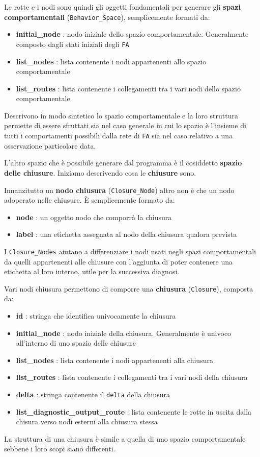 Le rotte e i nodi sono quindi gli oggetti fondamentali per generare gli \textbf{spazi comportamentali} (\texttt{Behavior\_Space}), semplicemente formati da:
\begin{itemize}
    \item \textbf{initial\_node} : nodo iniziale dello spazio comportamentale. Generalmente composto dagli stati iniziali degli \texttt{FA} 
    \item \textbf{list\_nodes} : lista contenente i nodi appartenenti allo spazio comportamentale
    \item \textbf{list\_routes} : lista contenente i collegamenti tra i vari nodi dello spazio comportamentale
\end{itemize}

Descrivono in modo sintetico lo spazio comportamentale e la loro struttura permette di essere sfruttati sia nel caso generale in cui lo spazio è l'insieme di tutti i comportamenti possibili dalla rete di \texttt{FA} sia nel caso relativo a una osservazione particolare data.

L'altro spazio che è possibile generare dal programma è il cosiddetto \textbf{spazio delle chiusure}. Iniziamo descrivendo cosa le \textbf{chiusure} sono.

Innanzitutto un \textbf{nodo chiusura} (\texttt{Closure\_Node}) altro non è che un nodo adoperato nelle chiusure. È semplicemente formato da:
\begin{itemize}
    \item \textbf{node} : un oggetto nodo che comporrà la chiusura
    \item \textbf{label} : una etichetta assegnata al nodo della chiusura qualora prevista
\end{itemize}
I \texttt{Closure\_Nodes} aiutano a differenziare i nodi usati negli spazi comportamentali da quelli appartenenti alle chiusure con l'aggiunta di poter contenere una etichetta al loro interno, utile per la successiva diagnosi. 

Vari nodi chiusura permettono di comporre una \textbf{chiusura} (\texttt{Closure}), composta da:
\begin{itemize}
    \item \textbf{id} : stringa che identifica univocamente la chiusura
    \item \textbf{initial\_node} : nodo iniziale della chiusura. Generalmente è univoco all'interno di uno spazio delle chiusure
    \item \textbf{list\_nodes} : lista contenente i nodi appartenenti alla chiusura
    \item \textbf{list\_routes} : lista contenente i collegamenti tra i vari nodi della chiusura
    \item \textbf{delta} : stringa contenente il \texttt{delta} della chiusura
    \item \textbf{list\_diagnostic\_output\_route} : lista contenente le rotte in uscita dalla chisura verso nodi esterni alla chiusura stessa
\end{itemize}
La struttura di una chiusura è simile a quella di uno spazio comportamentale sebbene i loro scopi siano differenti.

